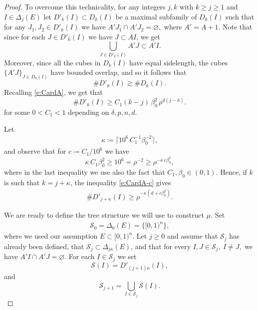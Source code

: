 \documentclass[11pt,reqno]{amsart}
\def\dS{{\mathcal{S}}}
\theoremstyle{definition}
\theoremstyle{remark}
\numberwithin{equation}{section}
\theoremstyle{theorem}
\theoremstyle{definition}
\theoremstyle{remark}
\numberwithin{equation}{section}
\begin{document}
\begin{proof}
	To overcome this technicality, for any integers $j,k$ with $k\ge j\ge 1$ and $I\in\Delta_j(E)$ let $D'_k(I)\subset D_k(I)$ be a maximal subfamily of $D_k(I)$ such that for any $J_1, J_2\in D'_k(I)$ we have $A'J_1\cap A'J_2=\varnothing,$ where $A'=A+1$. Note that since for each $J\in D'_k(I)$ we have $J\subset AI$, we get
	\begin{equation*}
	\bigcup_{J\in D'_k(I)}A'J\subset A'I.
	\end{equation*} 
	Moreover, since all the cubes in $D_k(I)$ have equal sidelength, the cubes $\{A'J\}_{J\in D_k(I)}$ have bounded overlap, and so it follows that 
	\begin{equation*}
	\#D'_k(I)\gtrsim \#D_k(I).
	\end{equation*}	
	Recalling \eqref{e:CardA}, we get that
	\begin{equation}\label{e:CardA-c}
	\#D'_k(I) \ge C_1 (k-j) \, \beta_0^2\, \rho^{d(j-k)}.
	\end{equation}
	for some $0<C_1<1$ depending on $\delta,p,n,d$. 
	
	Let
	\begin{align*}
	\kappa\coloneqq \lceil 10^6\, C_1^{-1} \beta_0^{-2}\rceil,
	\end{align*}
	and observe that for $c \coloneqq C_1/10^6$ we have
	\begin{equation*}
	\kappa\, C_1 \beta_0^2 \geq 10^6=\rho^{-2}\ge \rho^{-\kappa\,  c \beta_0^2},
	\end{equation*}
	where in the last inequality we use also the fact that $C_1,\beta_0\in (0,1)$.	
	Hence, if $k$ is such that $k =j+ \kappa$, the inequality \eqref{e:CardA-c} gives
	\begin{align} \label{e:CardA-b}
	\#D'_{j+\kappa}(I) \geq \rho^{-\kappa(d+ c\beta_0^2)}.
	\end{align}
	
	We are ready to define the tree structure we will use to construct $\mu$. Set
	\begin{align*}
	\dS_0 = \Delta_{0}(E)=\{[0,1)^n\},
	\end{align*}
	where we used our assumption $E\subset [0,1)^n$. Let $j\ge 0$ and assume that $\dS_j$ has already been defined, that $\dS_j\subset \Delta_{j\kappa}(E)$, and that for every $I,J\in\dS_{j},\ I\neq J,$ we have $A'I\cap A'J=\varnothing$. For each $I\in\dS_j$ we set
	\begin{equation*}
	\dS(I) = D'_{(j+1)\kappa}(I),
	\end{equation*}
	and
	\begin{equation*}
	\dS_{j+1} = \bigcup_{I\in\dS_j}\dS(I).
	\end{equation*}
	

\end{proof}
\end{document}
